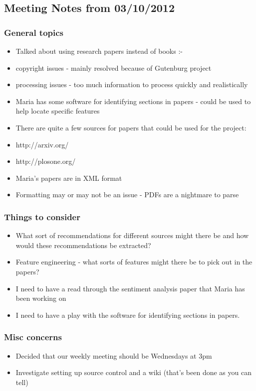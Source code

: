\subsection{Meeting Notes from 03/10/2012}

\subsubsection{General topics}

\begin{itemize}
\item
  Talked about using research papers instead of books :-
\item
  copyright issues - mainly resolved because of Gutenburg project
\item
  processing issues - too much information to process quickly and
  realistically
\item
  Maria has some software for identifying sections in papers - could be
  used to help locate specific features
\item
  There are quite a few sources for papers that could be used for the
  project:
\item
  http://arxiv.org/
\item
  http://plosone.org/
\item
  Maria's papers are in XML format
\item
  Formatting may or may not be an issue - PDFs are a nightmare to parse
\end{itemize}

\subsubsection{Things to consider}

\begin{itemize}
\item
  What sort of recommendations for different sources might there be and
  how would these recommendations be extracted?
\item
  Feature engineering - what sorts of features might there be to pick
  out in the papers?
\item
  I need to have a read through the sentiment analysis paper that Maria
  has been working on
\item
  I need to have a play with the software for identifying sections in
  papers.
\end{itemize}

\subsubsection{Misc concerns}

\begin{itemize}
\item
  Decided that our weekly meeting should be Wednesdays at 3pm
\item
  Investigate setting up source control and a wiki (that's been done as
  you can tell)
\end{itemize}
